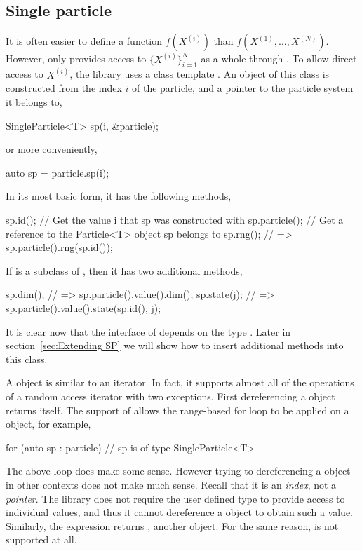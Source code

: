 \subsection{Single particle}
\label{sub:Single particle}

It is often easier to define a function $f(X^{(i)})$ than
$f(X^{(1)},\dots,X^{(N)})$. However,  only provides
access to $\{X^{(i)}\}_{i=1}^N$ as a whole through
. To allow direct access to $X^{(i)}$, the library
uses a class template . An object of this class is
constructed from the index $i$ of the particle, and a pointer to the particle
system it belongs to,
\begin{cppcode}
  SingleParticle<T> sp(i, &particle);
\end{cppcode}
or more conveniently,
\begin{cppcode}
  auto sp = particle.sp(i);
\end{cppcode}
In its most basic form, it has the following methods,
\begin{cppcode}
  sp.id();       // Get the value i that sp was constructed with
  sp.particle(); // Get a reference to the Particle<T> object sp belongs to
  sp.rng();      // => sp.particle().rng(sp.id());
\end{cppcode}
If  is a subclass of , then it has two
additional methods,
\begin{cppcode}
  sp.dim();    // => sp.particle().value().dim();
  sp.state(j); // => sp.particle().value().state(sp.id(), j);
\end{cppcode}
It is clear now that the interface of  depends on
the type . Later in section~\ref{sec:Extending SP}
we will show how to insert additional methods into this class.

A  object is similar to an iterator. In fact, it
supports almost all of the operations of a random access iterator with two
exceptions. First dereferencing a  object returns
itself. The support of  allows the range-based for loop to
be applied on a  object, for example,
\begin{cppcode}
  for (auto sp : particle) {
      // sp is of type SingleParticle<T>
  }
\end{cppcode}
The above loop does make some sense. However trying to dereferencing a
 object in other contexts does not make much
sense. Recall that it is an \emph{index}, not a \emph{pointer}. The library
does not require the user defined type  to provide access to
individual values, and thus it cannot dereference a
 object to obtain such a value. Similarly, the
expression  returns , another
 object. For the same reason,
 is not supported at all.

